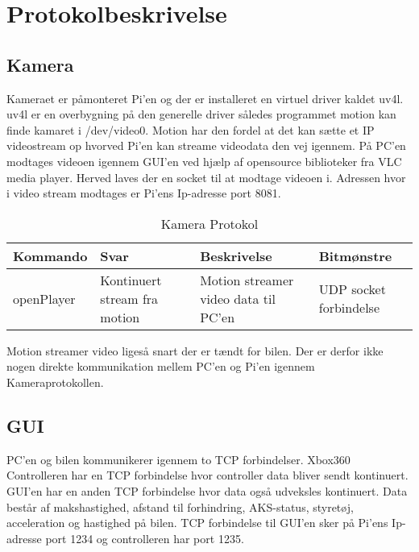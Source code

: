 \section{Protokolbeskrivelse}

\subsection{Kamera}

Kameraet er påmonteret Pi'en og der er installeret en virtuel driver kaldet uv4l. uv4l er en overbygning på den generelle driver således programmet motion kan finde kamaret i /dev/video0. Motion har den fordel at det kan sætte et IP videostream op hvorved Pi’en kan streame videodata den vej igennem. På PC'en modtages videoen igennem GUI'en ved hjælp af opensource biblioteker fra VLC media player. Herved laves der en socket til at modtage videoen i. Adressen hvor i video stream modtages er Pi'ens Ip-adresse port 8081.

\begin{table}[h]
\begin{tabularx}{\textwidth}{| Z | Z | Z | Z |} \hline

\textbf{Kommando} 						&
\textbf{Svar}							&
\textbf{Beskrivelse}					&
\textbf{Bitmønstre}						\\ \hline

openPlayer								&
Kontinuert stream fra motion			&
Motion streamer video data til PC'en	&
UDP socket forbindelse					\\ \hline

\end{tabularx}
\caption{Kamera Protokol}
\label{tbl:prt_cam}
\end{table}

Motion streamer video ligeså snart der er tændt for bilen. Der er derfor ikke nogen direkte kommunikation mellem PC'en og Pi'en igennem Kameraprotokollen.


\subsection{GUI}

PC'en og bilen kommunikerer igennem to TCP forbindelser. Xbox360 Controlleren har en TCP forbindelse hvor controller data bliver sendt kontinuert. GUI'en har en anden TCP forbindelse hvor data også udveksles kontinuert. Data består af makshastighed, afstand til forhindring, AKS-status,  styretøj, acceleration og hastighed på bilen. TCP forbindelse til GUI'en sker på Pi'ens Ip-adresse port 1234 og controlleren har port 1235.

